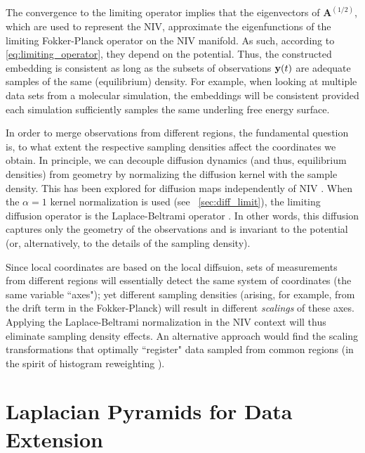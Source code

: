 The convergence to the limiting operator implies that the eigenvectors of $\mathbf{A}^{(1/2)}$, which are used to represent the NIV, approximate the eigenfunctions of the limiting Fokker-Planck operator on the NIV manifold.
%
As such, according to \eqref{eq:limiting_operator}, they depend on the potential.
%
Thus, the constructed embedding is consistent as long as the subsets of observations $\mathbf{y}(t)$ are
adequate samples of the same (equilibrium) density.
%
For example, when looking at multiple data sets from a molecular simulation, the embeddings will be consistent provided each simulation sufficiently samples the same underling free energy surface.

In order to merge observations from different regions,
the fundamental question is, to what extent the respective sampling densities affect the coordinates we obtain.
%
In principle, we can decouple diffusion dynamics (and thus, equilibrium densities)
from geometry by normalizing the diffusion kernel with the sample density.
%
This has been explored for diffusion maps independently of NIV \cite{coifman2005geometric}.
%
When the $\alpha=1$ kernel normalization is used (see \sec~\ref{sec:diff_limit}),
the limiting diffusion operator is the Laplace-Beltrami operator \cite{nadler2006diffusion}.
%
In other words, this diffusion captures only the geometry of the observations and is invariant to the potential (or, alternatively,
to the details of the sampling density).

Since local coordinates are based on the local diffsuion, sets of measurements from different regions
will essentially detect the same system of coordinates (the same variable ``axes");
yet different sampling densities (arising, for example,
from the drift term in the Fokker-Planck) will result in different {\em scalings} of these axes.
%
Applying the Laplace-Beltrami normalization in the NIV context will thus eliminate sampling density effects.
%
An alternative approach would find the scaling transformations that optimally ``register"
data sampled from common regions (in the spirit of histogram reweighting \cite{ferrenberg1988new}).


\section{Laplacian Pyramids for Data Extension} \label{sec:LapPyr}

